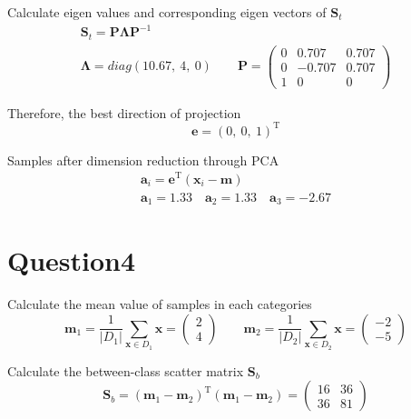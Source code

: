 \documentclass{article}
\begin{document}
Calculate eigen values and corresponding eigen vectors of $\mathbf{S}_{t}$
\begin{gather*}
    \mathbf{S}_{t} = \mathbf{P} \mathbf{\Lambda} \mathbf{P}^{-1} \\
    \mathbf{\Lambda} = diag(10.67,\ 4,\ 0) \qquad
    \mathbf{P} = 
    \begin{pmatrix}
        0   &   0.707   &   0.707 \\
        0   &   -0.707  &   0.707 \\
        1   &   0       &   0
    \end{pmatrix}
\end{gather*}

Therefore, the best direction of projection
\begin{equation*}
    \boldsymbol{e} = (0,\ 0,\ 1)^{\mathrm{T}}
\end{equation*}

Samples after dimension reduction through PCA
\begin{gather*}
    \boldsymbol{a}_{i} = \boldsymbol{e}^{\mathrm{T}} (\boldsymbol{x}_{i} - \boldsymbol{m}) \\
    \boldsymbol{a}_{1} = 1.33 \quad \boldsymbol{a}_{2} = 1.33 \quad \boldsymbol{a}_{3} = -2.67
\end{gather*}

\section*{Question4}

Calculate the mean value of samples in each categories
\begin{equation*}
    \boldsymbol{m}_{1} = \frac{1}{ |D_{1}| } \sum_{\boldsymbol{x} \in D_{1}} \boldsymbol{x} =
    \begin{pmatrix}
        2 \\
        4
    \end{pmatrix}
    \qquad
    \boldsymbol{m}_{2} = \frac{1}{ |D_{2}| } \sum_{\boldsymbol{x} \in D_{2}} \boldsymbol{x} =
    \begin{pmatrix}
        -2 \\
        -5
    \end{pmatrix}
\end{equation*}

Calculate the between-class scatter matrix $\mathbf{S}_{b}$
\begin{equation*}
    \mathbf{S}_{b} = (\boldsymbol{m}_{1} - \boldsymbol{m}_{2})^{\mathrm{T}} 
    (\boldsymbol{m}_{1} - \boldsymbol{m}_{2}) = 
    \begin{pmatrix}
        16  &   36 \\
        36  &   81
    \end{pmatrix}
\end{equation*}
\end{document}
